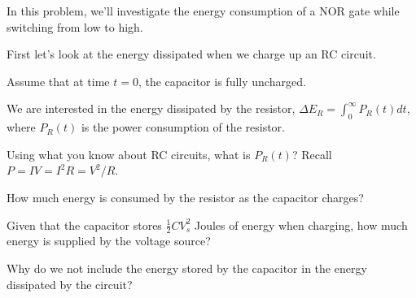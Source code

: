 
In this problem, we'll investigate the energy consumption of a NOR gate while switching from low to high.

First let's look at the energy dissipated when we charge up an RC circuit.



Assume that at time $t = 0$, the capacitor is fully uncharged.

\begin{enumerate}

\qitem We are interested in the energy dissipated by the resistor, $\Delta E_R = \int_0^\infty P_R(t) dt$, where $P_R(t)$ is the power consumption of the resistor. 

Using what you know about RC circuits, what is $P_R(t)$? Recall $P = IV = I^2R = V^2 / R$.




\qitem How much energy is consumed by the resistor as the capacitor charges?



\qitem Given that the capacitor stores $\frac{1}{2}CV_s^2$ Joules of energy when charging, how much energy is supplied by the voltage source? 

Why do we not include the energy stored by the capacitor in the energy dissipated by the circuit?

\end{enumerate}

